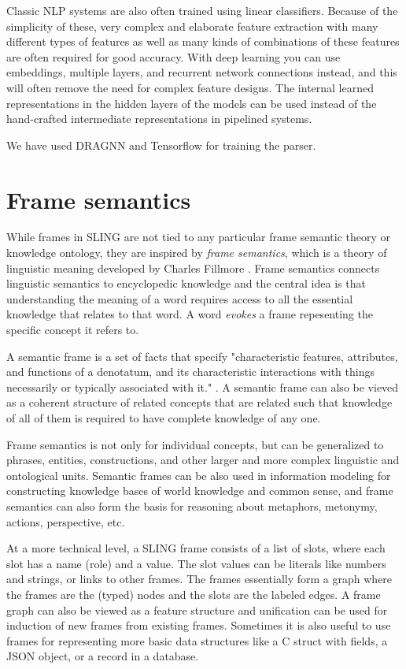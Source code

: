 \documentclass[11pt,a4paper]{article}
\begin{document}
Classic NLP systems are also often trained using linear classifiers.
Because of the simplicity of these, very complex and elaborate feature
extraction with many different types of features as well as many kinds
of combinations of these features are often required for good accuracy.
With deep learning you can use embeddings, multiple layers, and recurrent
network connections instead, and this will often remove the need for complex
feature designs. The internal learned representations in the hidden layers of
the models can be used instead of the hand-crafted intermediate representations
in pipelined systems.

We have used DRAGNN \cite{dragnn} and Tensorflow \cite{tensorflow} for training the
parser.

\section{Frame semantics}

While frames in SLING are not tied to any particular frame semantic theory or
knowledge ontology, they are inspired by \emph{frame semantics}, which is a
theory of linguistic meaning developed by Charles Fillmore \cite{fillmore1982}.
Frame semantics connects linguistic semantics to encyclopedic knowledge and the
central idea is that understanding the meaning of a word requires access to all
the essential knowledge that relates to that word. A word \emph{evokes} a frame
repesenting the specific concept it refers to.

A semantic frame is a set of facts that specify "characteristic
features, attributes, and functions of a denotatum, and its characteristic
interactions with things necessarily or typically associated with it." \cite{alan2001}.
A semantic frame can also be vieved as a coherent structure of related concepts
that are related such that knowledge of all of them is required to have
complete knowledge of any one.

Frame semantics is not only for individual concepts, but can be generalized
to phrases, entities, constructions, and other larger and more complex linguistic
and ontological units. Semantic frames can be also used in information modeling
for constructing knowledge bases of world knowledge and common sense, and frame
semantics can also form the basis for reasoning about metaphors, metonymy,
actions, perspective, etc.

At a more technical level, a SLING frame consists of a list of slots, where each
slot has a name (role) and a value. The slot values can be literals like numbers
and strings, or links to other frames. The frames essentially form a graph where
the frames are the (typed) nodes and the slots are the labeled edges. A frame
graph can also be viewed as a feature structure \cite{carpenter2005} and
unification can be used for induction of new frames from existing frames.
Sometimes it is also useful to use frames for representing more basic data
structures like a C struct with fields, a JSON object, or a record in a
database.
\end{document}
